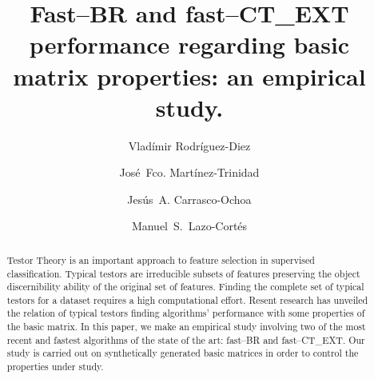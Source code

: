 \documentclass[citeauthoryear]{llncs}
\begin{document}
\mainmatter              %
%
\title{Fast--BR and fast--CT\_EXT performance regarding basic matrix properties: an empirical study.}
%
			 
\author{Vlad\'{i}mir Rodr\'{i}guez-Diez \and Jos\'{e}~Fco. Mart\'{i}nez-Trinidad
		 \and Jes\'{u}s~A. Carrasco-Ochoa \and Manuel~S.~Lazo-Cortés}
%
%
%


\maketitle              %

\begin{abstract}
	Testor Theory is an important approach to feature selection in supervised classification. Typical testors are irreducible subsets of features preserving the object discernibility ability of the original set of features. 
	Finding the complete set of typical testors for a dataset requires a high computational effort. Resent research has unveiled the relation of typical testors finding algorithms' performance with some properties of the basic matrix. In this paper, we make an empirical study involving two of the most recent and fastest algorithms of the state of the art: fast--BR and fast--CT\_EXT. Our study is carried out on synthetically generated basic matrices in order to control the properties under study.

\end{abstract}
%
\end{document}
